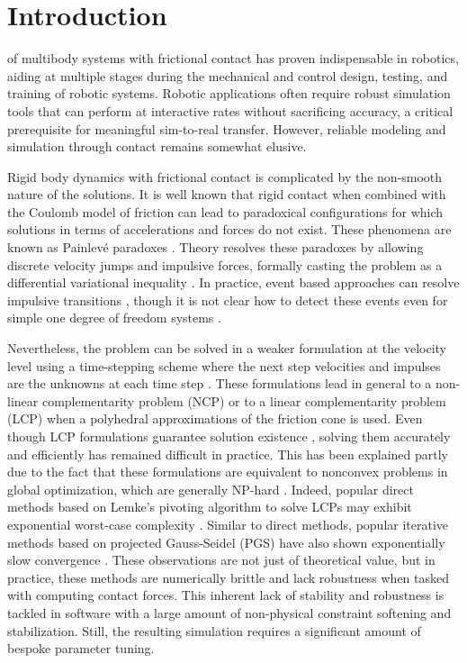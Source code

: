 \section{Introduction}
\label{sec:introduction}

 of multibody systems with frictional contact has
proven indispensable in robotics, aiding at multiple stages during the
mechanical and control design, testing, and training of robotic systems.
Robotic applications often require robust simulation tools that can perform at
interactive rates without sacrificing accuracy, a critical prerequisite for
meaningful sim-to-real transfer. However, reliable modeling and simulation
through contact remains somewhat elusive.

Rigid body dynamics with frictional contact is complicated by the non-smooth
nature of the solutions. It is well known \cite{bib:baraff1993issues} that rigid
contact when combined with the Coulomb model of friction can lead to paradoxical
configurations for which solutions in terms of accelerations and forces do not
exist. These phenomena are known as Painlev\'e paradoxes
\cite{bib:hogan2017regularization}. Theory resolves these paradoxes by allowing
discrete velocity jumps and impulsive forces, formally casting the problem as a
differential variational inequality \cite{bib:pang2008differential}. In practice,
event based approaches can resolve impulsive transitions \cite{bib:haug1986},
though it is not clear how to detect these events even for simple one degree of
freedom systems \cite{bib:hogan2017regularization}.

Nevertheless, the problem can be solved in a weaker formulation at the velocity
level using a time-stepping scheme where the next step velocities and impulses
are the unknowns at each time
step \cite{bib:stewart1996implicit, bib:anitescu1997}. These formulations lead
in general to a non-linear complementarity problem (NCP) or to a linear
complementarity problem (LCP) when a polyhedral approximations of the friction
cone is used. Even though LCP formulations guarantee solution existence
\cite{bib:anitescu1997, bib:stewart1998convergence}, solving them accurately and
efficiently has remained difficult in practice. This has been explained
partly due to the fact that these formulations are equivalent to nonconvex problems
in global optimization, which are generally NP-hard \cite{bib:Kaufman2008}.
Indeed, popular direct methods based on Lemke's pivoting algorithm to solve
LCPs may exhibit exponential worst-case complexity \cite{bib:baraff1994fast}. Similar
to direct methods, popular iterative methods based on projected
Gauss-Seidel (PGS) \cite{bib:duriez2006_realistic_haptic_rendering, bib:bullet}
have also shown exponentially slow convergence \cite{bib:erleben2007velocity}.
These observations are not just of theoretical value, but in practice,
these methods are numerically brittle and lack robustness when tasked with computing contact forces.
This inherent lack of stability and robustness is tackled in software with a
large amount of non-physical constraint softening and stabilization.
Still, the resulting simulation requires a significant amount of bespoke parameter tuning.

